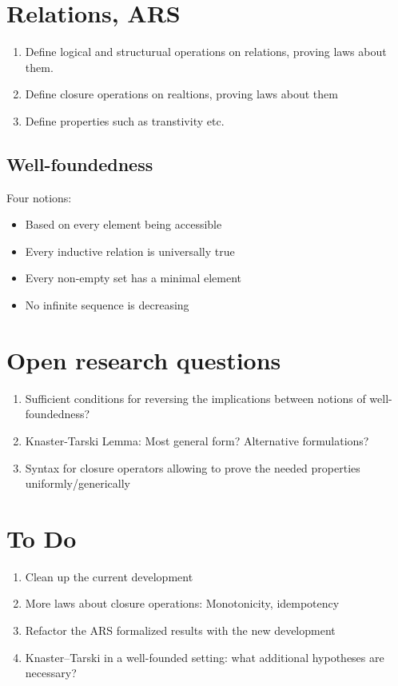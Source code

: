 \documentclass{scrartcl}
\begin{document}
\section{Relations, ARS}


\begin{enumerate}
  \item Define logical and structurual operations on relations, proving laws about them.
  \item Define closure operations on realtions, proving laws about them
  \item Define properties such as transtivity etc.
\end{enumerate}

\subsection{Well-foundedness}

Four notions:
\begin{itemize}
  \item Based on every element being accessible
  \item Every inductive relation is universally true
  \item Every non-empty set has a minimal element
  \item No infinite sequence is decreasing
\end{itemize}



\section{Open research questions}
\begin{enumerate}
  \item Sufficient conditions for reversing the implications between notions of
  well-foundedness?
  \item Knaster-Tarski Lemma: Most general form? Alternative formulations?
  \item Syntax for closure operators allowing to prove the needed properties
  uniformly/generically
\end{enumerate}

\section{To Do}
\begin{enumerate}
  \item Clean up the current development
  \item More laws about closure operations: Monotonicity, idempotency
  \item Refactor the ARS formalized results with the new development
  \item Knaster--Tarski in a well-founded setting: what additional
  hypotheses are necessary?
\end{enumerate}
\end{document}
